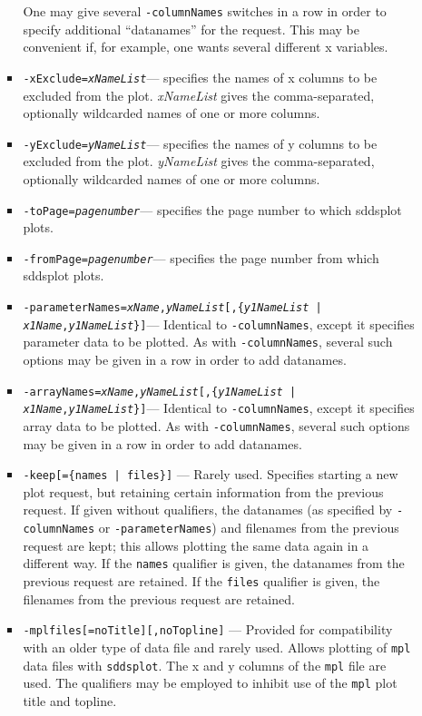 \begin{itemize}
\begin{itemize}
\begin{itemize}
        One may give several {\tt -columnNames} switches in a row in order to specify additional ``datanames'' for
        the request.  This may be convenient if, for example, one wants several different x variables.
  \item {\tt -xExclude={\em xNameList}}---
        specifies the names of x columns to be excluded from the plot. 
        {\em xNameList} gives the comma-separated, optionally wildcarded names of one or more columns.
  \item {\tt -yExclude={\em yNameList}}---
        specifies the names of y columns to be excluded from the plot. 
        {\em yNameList} gives the comma-separated, optionally wildcarded names of one or more columns.
  \item {\tt -toPage={\em pagenumber}}---
        specifies the page number to which sddsplot plots.
  \item {\tt -fromPage={\em pagenumber}}---
        specifies the page number from which sddsplot plots.      
  \item {\tt -parameterNames={\em xName},{\em yNameList}[,\{{\em y1NameList} | {\em x1Name},{\em y1NameList}\}]}---
        Identical to {\tt -columnNames}, except it specifies parameter data to be plotted.  As with {\tt -columnNames},
        several such options may be given in a row in order to add datanames.
  \item {\tt -arrayNames={\em xName},{\em yNameList}[,\{{\em y1NameList} | {\em x1Name},{\em y1NameList}\}]}---
        Identical to {\tt -columnNames}, except it specifies array data to be plotted.  As with {\tt -columnNames},
        several such options may be given in a row in order to add datanames.

  \item {\tt -keep[=\{names | files\}]} ---
        Rarely used.
        Specifies starting a new plot request, but retaining certain information from the previous request.
        If given without qualifiers, the datanames (as specified by {\tt -columnNames} or {\tt -parameterNames})
        and filenames from the previous request are kept; this allows plotting the same data again in a different
        way.  If the {\tt names} qualifier is given, the datanames from the previous request are retained.
        If the {\tt files} qualifier is given, the filenames from the previous request are retained.

  \item {\tt -mplfiles[=noTitle][,noTopline]} ---
        Provided for compatibility with an older type of data file and rarely used.
        Allows plotting of {\tt mpl} data files with {\tt sddsplot}.  The x and y columns of the {\tt mpl} file
        are used.  The qualifiers may be employed to inhibit use of the {\tt mpl} plot title and topline.


\end{itemize}
\end{itemize}
\end{itemize}

